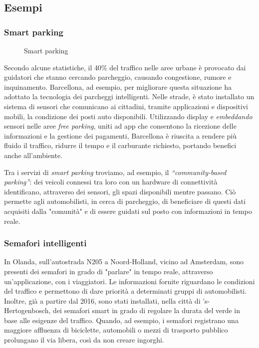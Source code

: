 \subsection{Esempi}

\subsubsection{Smart parking}

\begin{wrapfigure}{r}{0.4\textwidth}
\centering
{}
\caption{Smart parking}
\label{fig:smart_parking}
\end{wrapfigure}

Secondo alcune statistiche, il 40\% del traffico nelle aree urbane è provocato dai guidatori che stanno cercando parcheggio, causando congestione, rumore e inquinamento. Barcellona, ad esempio, per migliorare questa situazione ha adottato la tecnologia dei parcheggi intelligenti. Nelle strade, è stato installato un sistema di sensori che comunicano ai cittadini, tramite applicazioni e dispositivi mobili, la condizione dei posti auto disponibili. Utilizzando display e \textit{embeddando} sensori nelle aree \textit{free parking}, uniti ad app che consentono la ricezione delle informazioni e la gestione dei pagamenti, Barcellona è riuscita a rendere più fluido il traffico, ridurre il tempo e il carburante richiesto, portando benefici anche all'ambiente.  

Tra i servizi di \textit{smart parking} troviamo, ad esempio, il \textit{“community-based parking”}: dei veicoli connessi tra loro con un hardware di connettività identificano, attraverso dei sensori, gli spazi disponibili mentre passano. Ciò permette agli automobilisti, in cerca di parcheggio, di beneficiare di questi dati acquisiti dalla "comunità" e di essere guidati sul posto con informazioni in tempo reale. 

\subsubsection{Semafori intelligenti}

In Olanda, sull’autostrada N205 a Noord-Holland, vicino ad Amsterdam, sono presenti dei semafori in grado di "parlare" in tempo reale, attraverso un'applicazione, con i viaggiatori. Le informazioni fornite riguardano le condizioni del traffico e permettono di dare priorità a determinati gruppi di automobilisti. Inoltre, già a partire dal 2016, sono stati installati, nella città di 's-Hertogenbosch, dei semafori smart in grado di regolare la durata del verde in base alle esigenze del traffico. Quando, ad esempio, i semafori registrano una maggiore affluenza di biciclette, automobili o mezzi di trasporto pubblico prolungano il via libera, così da non creare ingorghi. 

